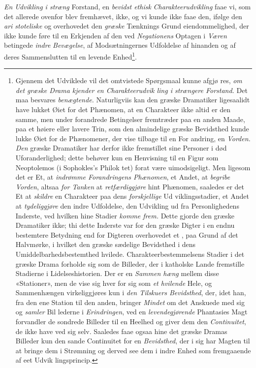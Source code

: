 \emph{En Udvikling i stræng} Forstand, en \emph{bevidst ethisk}
\emph{Charakteerudvikling} faae vi, som det allerede ovenfor blev
fremhævet, ikke, og vi kunde ikke faae den, ifølge den \emph{ari\-%
stoteliske} og overhovedet den \emph{græske} Tænknings Grund\-%
eiendommelighed, der ikke kunde føre til en Erkjenden af
den ved \emph{Negationens} Optagen i \emph{Væren} betingede \emph{indre}
 \setcounter{footnote}{0}
\emph{Bevægelse}, af Modsætningernes Udfoldelse af hinanden og
af deres Sammenslutten til en levende Enhed\footnote{Gjennem det
Udviklede vil det omtvistede Spørgsmaal kunne afgjø\-%
res, \emph{om det græske Drama kjender en Charakteerudvik\-%
ling i strængere Forstand.} Det maa besvares \emph{benægtende.}
Naturligviis kan den græske Dramatiker ligesaalidt have lukket Øiet
for det Phænomen, at en Charakteer ikke altid er den samme, men
under forandrede Betingelser fremtræder paa en anden Maade, paa
et høiere eller lavere Trin, som den almindelige græske Bevidsthed
kunde lukke Øiet for de Phænomener, der vise tilbage til en For\-%
andring, en \emph{Vorden.} \emph{Den} græske Dramatiker har derfor ikke
fremstillet sine Personer i død Uforanderlighed; dette behøver kun
en Henvisning til en Figur som Neoptolemos (i Sophokles's Philok\-%
tet) forat være uimodsigeligt. Men ligesom det er Et, at \emph{indrømme
Forandringens Phænomen}, et Andet, at \emph{begribe Vorden},
altsaa \emph{for Tanken} at \emph{retfærdiggjøre} hint Phænomen, saaledes
er det Et at \emph{skildre} en Charakteer paa dens \emph{forskjellige} Ud\-%
viklingsstadier, et Andet at \emph{tydeliggjøre} den indre Udfoldelse,
den Udvikling ud fra Personlighedens Inderste, ved hvilken hine
Stadier \emph{komme frem.} Dette gjorde den græske Dramatiker ikke;
thi dette Inderste var for den græske Digter i en endnu bestemtere
Betydning end for Digteren overhovedet et , paa Grund af
det Halvmørke, i hvilket den græske sædelige Bevidsthed i dens
Umiddelbarhedsbestemthed hvilede. Charakteerbestemmelsens Stadier
i det græske Drama forholde sig som de Billeder, der i katholske
Lande fremstille Stadierne i Lidelseshistorien. Der er en \emph{Sammen\-%
hæng} mellem disse «Stationer», men de vise sig hver for sig som
\emph{et hvilende} Hele, og Sammenhængen virkeliggjøres kun i \emph{den
Tilskuers Bevidsthed}, der, idet han, fra den ene Station til den
anden, bringer \emph{Mindet} om det Anskuede med sig og \emph{samler} Bil\-%
lederne i \emph{Erindringen}, ved en \emph{levendegjørende} Phantasies
Magt forvandler de sondrede Billeder til en Heelhed og giver dem
den \emph{Continuitet}, de ikke have ved sig selv. Saaledes faae ogsaa
hine det græske Dramas Billeder kun den sande Continuitet for en
\emph{Bevidsthed}, der i sig har Magten til at bringe dem i Strømning
og derved see dem i indre Enhed som fremgaaende af eet Udvik\-%
lingsprincip.}.
